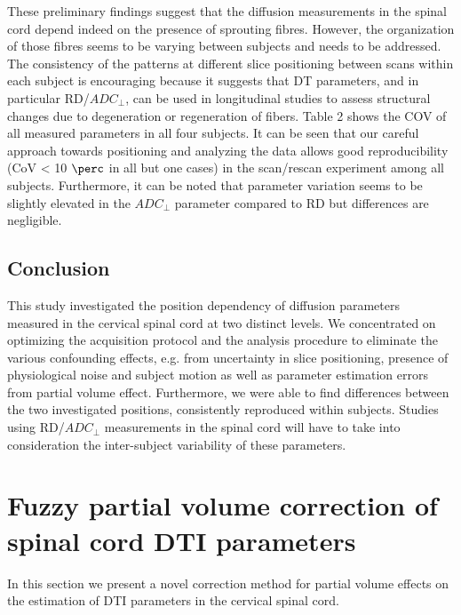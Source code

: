These preliminary findings suggest that the diffusion measurements in the spinal cord depend indeed on the presence of sprouting fibres. However, the organization of those fibres seems to be varying between subjects and needs to be addressed. The consistency of the patterns at different slice positioning between scans within each subject is encouraging because it suggests that DT parameters, and in particular RD/$ADC_\perp$, can be used in longitudinal studies to assess structural changes due to degeneration or regeneration of fibers. Table 2 shows the COV of all measured parameters in all four subjects. It can be seen that our careful approach towards positioning and analyzing the data allows good reproducibility (CoV < 10 $\perc$ in all but one cases) in the scan/rescan experiment among all subjects. Furthermore, it can be noted that parameter variation seems to be slightly elevated in the $ADC_\perp$ parameter compared to RD but differences are negligible.

\subsection*{Conclusion}
This study investigated the position dependency of diffusion parameters measured in the cervical spinal cord at two distinct levels. We concentrated on optimizing the acquisition protocol and the analysis procedure to eliminate the various confounding effects, e.g. from uncertainty in slice positioning, presence of physiological noise and subject motion as well as parameter estimation errors from partial volume effect. Furthermore, we were able to find differences between the two investigated positions, consistently reproduced within subjects. Studies using RD/$ADC_\perp$ measurements in the spinal cord will have to take into consideration the inter-subject variability of these parameters.
 
\section{Fuzzy partial volume correction of spinal cord DTI parameters}
In this section we present a novel correction method for partial volume effects on the estimation of DTI parameters in the cervical spinal cord.
